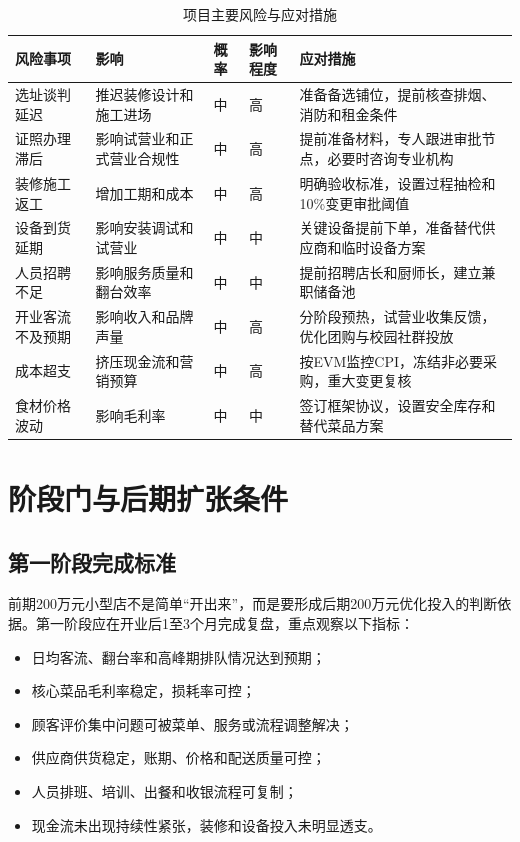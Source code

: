\documentclass[UTF8,zihao=-4]{ctexart}
\begin{document}
\begin{longtable}{p{3cm}p{3cm}p{2cm}p{2cm}p{4cm}}
  \caption{项目主要风险与应对措施}\\
  \toprule
  风险事项 & 影响 & 概率 & 影响程度 & 应对措施 \\
  \midrule
  选址谈判延迟 & 推迟装修设计和施工进场 & 中 & 高 & 准备备选铺位，提前核查排烟、消防和租金条件 \\
  证照办理滞后 & 影响试营业和正式营业合规性 & 中 & 高 & 提前准备材料，专人跟进审批节点，必要时咨询专业机构 \\
  装修施工返工 & 增加工期和成本 & 中 & 高 & 明确验收标准，设置过程抽检和10\%变更审批阈值 \\
  设备到货延期 & 影响安装调试和试营业 & 中 & 中 & 关键设备提前下单，准备替代供应商和临时设备方案 \\
  人员招聘不足 & 影响服务质量和翻台效率 & 中 & 中 & 提前招聘店长和厨师长，建立兼职储备池 \\
  开业客流不及预期 & 影响收入和品牌声量 & 中 & 高 & 分阶段预热，试营业收集反馈，优化团购与校园社群投放 \\
  成本超支 & 挤压现金流和营销预算 & 中 & 高 & 按EVM监控CPI，冻结非必要采购，重大变更复核 \\
  食材价格波动 & 影响毛利率 & 中 & 中 & 签订框架协议，设置安全库存和替代菜品方案 \\
  \bottomrule
\end{longtable}

\section{阶段门与后期扩张条件}

\subsection{第一阶段完成标准}

前期200万元小型店不是简单“开出来”，而是要形成后期200万元优化投入的判断依据。第一阶段应在开业后1至3个月完成复盘，重点观察以下指标：

\begin{itemize}
  \item 日均客流、翻台率和高峰期排队情况达到预期；
  \item 核心菜品毛利率稳定，损耗率可控；
  \item 顾客评价集中问题可被菜单、服务或流程调整解决；
  \item 供应商供货稳定，账期、价格和配送质量可控；
  \item 人员排班、培训、出餐和收银流程可复制；
  \item 现金流未出现持续性紧张，装修和设备投入未明显透支。
\end{itemize}
\end{document}

